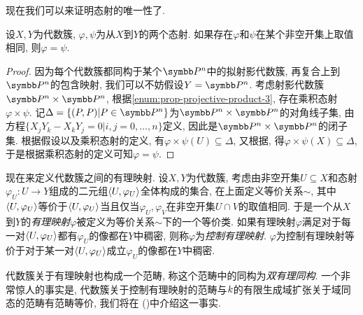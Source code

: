 现在我们可以来证明态射的唯一性了.

\begin{proposition}
    设$X, Y$为代数簇, $\varphi, \psi$为从$X$到$Y$的两个态射. 如果存在$\varphi$和$\psi$在某个非空开集上取值相同, 则$\varphi=\psi$.
\end{proposition}

\begin{proof}
    因为每个代数簇都同构于某个$\PP^n$中的拟射影代数簇, 再复合上到$\PP^n$的包含映射, 我们可以不妨假设$Y=\PP^n$. 考虑射影代数簇$\PP^n\times \PP^n$, 根据\ref{enum:prop-projective-product-3}, 存在乘积态射$\varphi\times \psi$. 记$\Delta=\{(P, P)\vert P\in \PP^n\}$为$\PP^n\times \PP^n$的对角线子集, 由方程$\{X_jY_k-X_kY_j=0\vert i, j=0, \dotsc, n\}$定义, 因此是$\PP^n\times \PP^n$的闭子集. 根据假设以及乘积态射的定义, 有$\varphi\times \psi(U)\subseteq \Delta$, 又根据, 得$\varphi\times \psi(X)\subseteq\Delta$, 于是根据乘积态射的定义可知$\varphi=\psi$.
\end{proof}

现在来定义代数簇之间的有理映射. 设$X, Y$为代数簇, 考虑由非空开集$U\subseteq X$和态射$\varphi_U\colon U\to Y$组成的二元组$\lr<>{U, \varphi_U}$全体构成的集合, 在上面定义等价关系$\sim$, 其中$\lr<>{U, \varphi_U}$等价于$\lr<>{U, \varphi_U}$当且仅当$\varphi_U, \varphi_V$在非空开集$U\cap V$的取值相同. 于是一个从$X$到$Y$的\emph{有理映射}$\varphi$被定义为等价关系$\sim$下的一个等价类. 如果有理映射$\varphi$满足对于每一对$\lr<>{U, \varphi_U}$都有$\varphi_U$的像都在$Y$中稠密, 则称$\varphi$为\emph{控制有理映射}. $\varphi$为控制有理映射等价于对于某一对$\lr<>{U, \varphi_U}$成立$\varphi_U$的像都在$Y$中稠密\parencite{andrew_how_2016}.

代数簇关于有理映射也构成一个范畴, 称这个范畴中的同构为\emph{双有理同构}. 一个非常惊人的事实是, 代数簇关于控制有理映射的范畴与$\kk$的有限生成域扩张关于域同态的范畴有范畴等价, 我们将在%
()中介绍这一事实.
